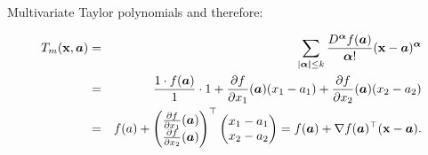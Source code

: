 \documentclass[11pt,compress,t,notes=noshow, xcolor=table]{beamer}
\begin{document}
\begin{vbframe}{Multivariate Taylor polynomials}
and therefore: 

\begin{eqnarray*}
  T_m(\mathbf{x},\bm{a}) &=& \sum_{|\bm{\alpha|} \le k} \frac{D^{\bm\alpha} f(\bm{a})}{\bm{\alpha}!} (\mathbf{x} - \bm{a})^{\bm{\alpha}} \\ &=& \frac{1 \cdot f(\bm{a})}{1} \cdot 1 + \frac{\partial f}{\partial x_1}(\bm{a}) (x_1 - a_1) + \frac{\partial f}{\partial x_2}(\bm{a}) (x_2 - a_2) \\
  &=& f(a) + \begin{pmatrix} \frac{\partial f}{\partial x_1} (\bm{a})\\ \frac{\partial f}{\partial x_2}(\bm{a})\end{pmatrix}^\top \begin{pmatrix} x_1 - a_1 \\ x_2 - a_2\end{pmatrix} = f(\bm{a}) + \nabla f(\bm{a})^\top (\mathbf{x} - \bm{a}). 
\end{eqnarray*}


\end{vbframe}



  \endlecture
\end{document}
